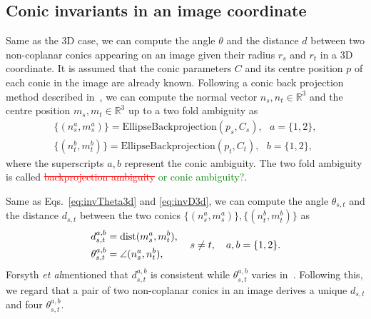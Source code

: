 \documentclass{bmvc2k}
\newcommand{\hemal}[2]{\textcolor{red}{\sout{#1}} \textcolor{green}{#2}}
\def\etal{\emph{et al}\bmvaOneDot}
\begin{document}
\subsection{Conic invariants in an image coordinate}\label{ssec:conicInv2D}
Same as the 3D case, we can compute the angle $\theta$ and the distance $d$ between two non-coplanar conics appearing on an image given their radius $r_s$ and $r_t$ in a 3D coordinate.
It is assumed that the conic parameters $C$ and its centre position $p$ of each conic in the image are already known.
Following a conic back projection method described in~\cite{forsyth_91}, we can compute the normal vector $n_s,n_t \in \mathbb{R}^3$ and the centre position $m_s,m_t \in \mathbb{R}^3$ up to a two fold ambiguity as
\begin{align} \label{Eq:Backprojection}
\{ ( n_s^a,m_s^a ) \} = \text{EllipseBackprojection}(p_s,C_s),~~~ a = \{1,2\}, \\
\{ ( n_t^b,m_t^b ) \} = \text{EllipseBackprojection}(p_t,C_t),~~~ b = \{1,2\},
\end{align}
where the superscripts $a,b$ represent the conic ambiguity.
The two fold ambiguity is called \hemal{backprojection ambiguity}{or conic ambiguity?}.

\par 
Same as Eqs.~\ref{eq:invTheta3d} and \ref{eq:invD3d}, we can compute the angle $\theta_{s,t}$ and the distance $d_{s,t}$ between the two conics $\{ ( n_s^a,m_s^a ) \},\{ ( n_t^b,m_t^b ) \}$ as
\begin{align}\label{eq:inv2D}
\left. \begin{aligned}
d_{s,t}^{a,b} &= {\rm dist}(m_s^a,m_t^b),\\
\theta_{s,t}^{a,b} &= \angle(n_s^a,n_t^b),
\end{aligned}
\right. ~~~s \neq t, ~~~ a,b = \{ 1,2 \}.
\end{align}
Forsyth \etal mentioned that $d_{s,t}^{a,b}$ is consistent while $\theta_{s,t}^{a,b}$ varies in~\cite{forsyth_91}.
Following this, we regard that a pair of two non-coplanar conics in an image derives a unique $d_{s,t}$ and four $\theta_{s,t}^{a,b}$.
\end{document}
